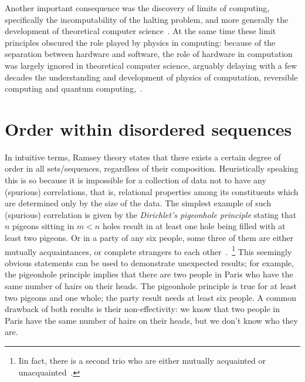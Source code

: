 \documentclass[12pt]{article}
\begin{document}
Another important consequence was the discovery of limits of computing,
specifically the incomputability of the halting problem,
and more generally the development of theoretical computer science~\cite{Gruska-foc}.
At the same time these limit principles obscured the role played by physics in computing:
because of the separation between hardware and software, the role of hardware in computation was largely ignored in theoretical computer science,
arguably delaying with a few decades the understanding and development of physics of computation,
reversible computing and quantum computing,~\cite{1402-4896-35-1-021, fr-kn-mar2,mermin-07}.


\section{Order within disordered sequences}

\label{2018-wos-sec2}
In intuitive terms, Ramsey theory states that there exists a certain degree of order in all sets/sequences,
regardless of their composition.
Heuristically speaking this is so because it is impossible for a collection of data
not to have any (spurious) correlations, that is,
relational properties among its constituents which are determined only by the size of the data.
The simplest example of such (spurious) correlation is given by the {\em Dirichlet's pigeonhole principle}
stating that $n$ pigeons sitting in $m<n$ holes result in at least one hole being filled with at least two pigeons.
Or in a party of any six people, some three of them are either mutually acquaintances,
or complete strangers to each other~\cite{Greenwood-Gleason-55,Bostwick-1959}.~\footnote{Iin fact,
there is a second trio who are either mutually acquainted or unacquainted~\cite{Bostwick-1959-Cheney}.}
This seemingly obvious statements can be used to demonstrate unexpected results; for example, the
pigeonhole principle implies that there are two people in Paris who have the same number of hairs on their heads.
The pigeonhole principle is true for at least two pigeons and one whole; the party result needs at least six people.
A common drawback of both results is their non-effectivity: we know that two people in Paris have the same number
of hairs on their heads, but we don't know who they are.
\end{document}
